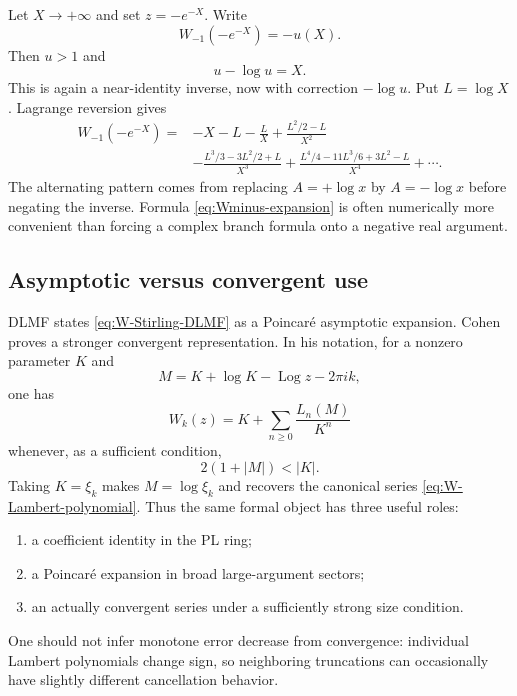 \documentclass[11pt,oneside]{article}
\numberwithin{equation}{section}
\theoremstyle{definition}
\newcommand{\Log}{\operatorname{Log}}
\begin{document}
Let \(X\to+\infty\) and set \(z=-e^{-X}\).  Write
\begin{equation}\label{eq:Wminus-u}
  W_{-1}(-e^{-X})=-u(X).
\end{equation}
Then \(u>1\) and
\begin{equation}\label{eq:u-minus-log-u}
  u-\log u=X.
\end{equation}
This is again a near-identity inverse, now with correction \(-\log u\).  Put
\(L=\log X\).  Lagrange reversion gives
\begin{align}
 W_{-1}(-e^{-X})={}&-X-L-\frac{L}{X}
 +\frac{L^2/2-L}{X^2}\nonumber\\
 &-\frac{L^3/3-3L^2/2+L}{X^3}
 +\frac{L^4/4-11L^3/6+3L^2-L}{X^4}
 +\cdots.
 \label{eq:Wminus-expansion}
\end{align}
The alternating pattern comes from replacing \(A=+\log x\) by
\(A=-\log x\) before negating the inverse.  Formula
\eqref{eq:Wminus-expansion} is often numerically more convenient than forcing a
complex branch formula onto a negative real argument.

\subsection{Asymptotic versus convergent use}

DLMF states \eqref{eq:W-Stirling-DLMF} as a Poincar\'e asymptotic expansion.
Cohen proves a stronger convergent representation.  In his notation, for a
nonzero parameter \(K\) and
\[
 M=K+\log K-\Log z-2\pi i k,
\]
one has
\begin{equation}\label{eq:Cohen-K-expansion}
  W_k(z)=K+\sum_{n\ge0}\frac{L_n(M)}{K^n}
\end{equation}
whenever, as a sufficient condition,
\begin{equation}\label{eq:Cohen-convergence-condition}
  2(1+|M|)<|K|.
\end{equation}
Taking \(K=\xi_k\) makes \(M=\log\xi_k\) and recovers the canonical series
\eqref{eq:W-Lambert-polynomial}.  Thus the same formal object has three useful
roles:
\begin{enumerate}
\item a coefficient identity in the PL ring;
\item a Poincar\'e expansion in broad large-argument sectors;
\item an actually convergent series under a sufficiently strong size condition.
\end{enumerate}
One should not infer monotone error decrease from convergence: individual
Lambert polynomials change sign, so neighboring truncations can occasionally
have slightly different cancellation behavior.
\end{document}
